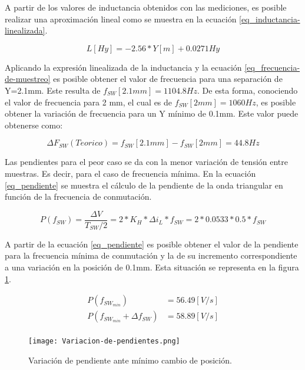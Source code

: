 \noindent A partir de los valores de inductancia  obtenidos con las mediciones, es posible realizar una aproximación lineal como se muestra en la ecuación \ref{eq_inductancia-linealizada}.

\begin{equation} \label{eq_inductancia-linealizada}
	L[Hy] = -2.56 * Y[m] + 0.0271 Hy
\end{equation}

\noindent Aplicando la expresión linealizada de la inductancia y la ecuación \ref{eq_frecuencia-de-muestreo} es posible obtener el valor de frecuencia para una separación de Y=2.1mm. Este resulta de $f_{SW}[2.1mm] = 1104.8 Hz$. De esta forma, conociendo el valor de frecuencia para 2 mm, el cual es de $f_{SW}[2mm] = 1060 Hz$, es posible obtener la variación de frecuencia para un Y mínimo de 0.1mm. Este valor puede obtenerse como:

\begin{equation} 
	\Delta F_{SW}(Teorico) = f_{SW}[2.1mm] - f_{SW}[2mm] = 44.8 Hz
\end{equation}

\noindent Las pendientes para el peor caso se da con la menor variación de tensión entre muestras. Es decir, para el caso de frecuencia mínima. En la ecuación \ref{eq_pendiente} se muestra el cálculo de la pendiente de la onda triangular en función de la frecuencia de conmutación.

\begin{equation} \label{eq_pendiente}
	P(f_{SW}) = \frac{\Delta V}{T_{SW}/2} = 2*K_H*\Delta i_L*f_{SW} = 2 * 0.0533 * 0.5 * f_{SW}
\end{equation}

\noindent A partir de la ecuación \ref{eq_pendiente} es posible obtener el valor de la pendiente para la frecuencia mínima de conmutación y la de su incremento correspondiente a una variación en la posición de 0.1mm. Esta situación se representa en la figura \ref{fig:variacion-de-pendiente}.

\begin{equation} 
	\begin{aligned}
		P(f_{SW_{min}}) &= 56.49 [V/s] \\
		P(f_{SW_{min}} + \Delta f_{SW}) &= 58.89 [V/s] \\
	\end{aligned}
\end{equation}


\begin{figure}[H]
	\centering
	\texttt{[image: Variacion-de-pendientes.png]}
	\caption{Variación de pendiente ante mínimo cambio de posición.}
	\label{fig:variacion-de-pendiente}
\end{figure}

